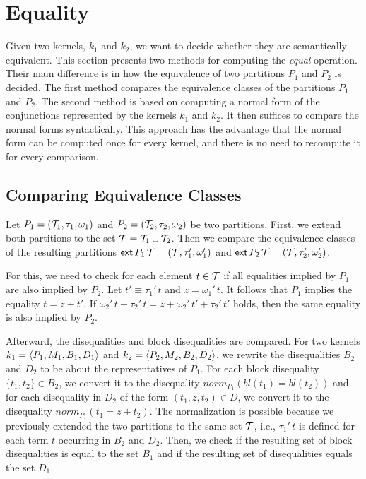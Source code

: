 \section{Equality}

Given two kernels, $k_1$ and $k_2$, we want to decide whether they are semantically equivalent.
This section presents two methods for computing the \emph{equal} operation.
Their main difference is in how the equivalence of two partitions $P_1$ and $P_2$ is decided.
The first method compares the equivalence classes of the partitions $P_1$ and $P_2$.
The second method is based on computing a normal form of the conjunctions represented by the kernels $k_1$ and $k_2$.
It then suffices to compare the normal forms syntactically.
This approach has the advantage that the normal form can be computed once for every kernel, and there is no need to recompute it for every comparison.

\subsection{Comparing Equivalence Classes}

Let $P_1 = (\mathcal{T}_1, \tau_1, \omega_1)$ and $P_2 = (\mathcal{T}_2, \tau_2, \omega_2)$ be two partitions.
First, we extend both partitions to the set $\mathcal{T} = \mathcal{T}_1 \cup \mathcal{T}_2$.
Then we compare the equivalence classes of the resulting partitions $\textsf{ext}\,{P_1}\,{\mathcal{T}} = (\mathcal{T}, \tau_1', \omega_1')$ and $\textsf{ext}\,{P_2}\,{\mathcal{T}} = (\mathcal{T}, \tau_2', \omega_2')$.

For this, we need to check for each element $t \in \mathcal{T}$ if all equalities implied by $P_1$ are also implied by $P_2$.
Let $t' \equiv \tau_1'\,t$ and $z = \omega_1'\,t$.
It follows that $P_1$ implies the equality $t = z + t'$.
If $\omega_2'\,t + \tau_2'\,t = z + \omega_2'\,t' + \tau_2'\,t'$ holds, then the same equality is also implied by $P_2$.

Afterward, the disequalities and block disequalities are compared.
For two kernels $k_1 = \langle P_1, M_1, B_1, D_1\rangle$ and $k_2 = \langle P_2, M_2, B_2, D_2\rangle$,
we rewrite the disequalities $B_2$ and $D_2$ to be about the representatives of $P_1$.
For each block disequality $\{t_1,t_2\} \in B_2$, we convert it to the disequality $norm_{P_1}(bl(t_1) = bl(t_2))$ and for each disequality in $D_2$ of the form $(t_1, z, t_2) \in D$, we convert it to the disequality $norm_{P_1}(t_1 = z + t_2)$.
The normalization is possible because we previously extended the two partitions to the same set $\mathcal{T}$, i.e., $\tau_1'\,t$ is defined for each term $t$ occurring in $B_2$ and $D_2$.
Then, we check if the resulting set of block disequalities is equal to the set $B_1$ and if the resulting set of disequalities equals the set $D_1$.

